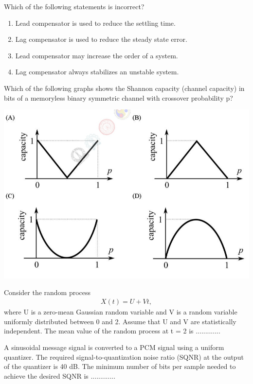 \item Which of the following statements is incorrect?
\begin{enumerate}
\item Lead compensator is used to reduce the settling time.
\item Lag compensator is used to reduce the steady state error.
\item Lead compensator may increase the order of a system.
\item Lag compensator always stabilizes an unstable system.
\end{enumerate}

\item Which of the following graphs shows the Shannon capacity (channel capacity) in bits of a memoryless binary symmetric channel with crossover probability p?

\includegraphics[scale=0.28]{21}

\item Consider the random process
\begin{align*}
X(t) = U + Vt,
\end{align*}
where U is a zero-mean Gaussian random variable and V is a random variable uniformly distributed between 0 and 2. Assume that U and V are statistically independent. The mean value of the random process at t = 2 is .............

\item A sinusoidal message signal is converted to a PCM signal using a uniform quantizer. The required signal-to-quantization noise ratio (SQNR) at the output of the quantizer is 40 dB. The minimum number of bits per sample needed to achieve the desired SQNR is .............


